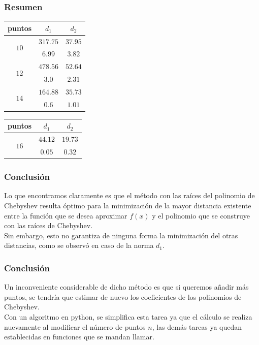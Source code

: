 \begin{frame}
\frametitle{Resumen}
\begin{minipage}[t]{0.4\textwidth}
\begin{table}
\fontsize{12}{12}\selectfont
\begin{tabular}{| c | c | c |} \hline
puntos & $d_{1}$ & $d_{2}$ \\\hline
\multirow{2}{*}{$10$} & $317.75$ & $37.95$ \\
    & $6.99$ & $3.82$ \\ \hline
    \multirow{2}{*}{$12$} & $478.56$ & $52.64$ \\
    & $3.0$ & $2.31$ \\ \hline 
    \multirow{2}{*}{$14$} & $164.88$ & $35.73$ \\
    & $0.6$ & $1.01$ \\ \hline
\end{tabular}
\end{table}
\end{minipage}
\hspace{1.5cm}
\begin{minipage}[t]{0.4\textwidth}
\begin{table}
\fontsize{12}{12}\selectfont
\begin{tabular}{| c | c | c |} \hline
puntos & $d_{1}$ & $d_{2}$ \\\hline
\multirow{2}{*}{$16$} & $44.12$ & $19.73$ \\
    & $0.05$ & $0.32$ \\ \hline
\end{tabular}
\end{table}
\end{minipage}
\end{frame}
\begin{frame}
\frametitle{Conclusión}
Lo que encontramos claramente es que el método con las raíces del polinomio de Chebyshev resulta óptimo para la minimización de la mayor distancia existente entre la función que se desea aproximar $f(x)$ y el polinomio que se construye con las raíces de Chebyshev.
\\
\bigskip
\pause
Sin embargo, esto no garantiza de ninguna forma la minimización del otras distancias, como se observó en caso de la norma $d_{1}$.
\end{frame}
\begin{frame}
\frametitle{Conclusión}
Un inconveniente considerable de dicho método es que si queremos añadir más puntos, se tendría que estimar de nuevo los coeficientes de los polinomios de Chebyshev.
\\
\bigskip
\pause
Con un algoritmo en python, se simplifica esta tarea ya que el cálculo se realiza nuevamente al modificar el número de puntos $n$, las demás tareas ya quedan establecidas en funciones que se mandan llamar.
\end{frame}
